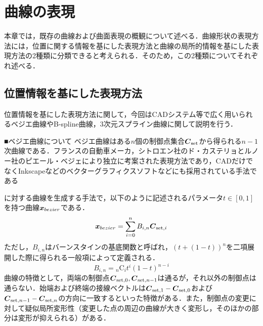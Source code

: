

\section{曲線の表現}
	本章では，既存の曲線および曲面表現の概観について述べる．曲線形状の表現方法には，位置に関する情報を基にした表現方法と曲線の局所的情報を基にした表現方法の2種類に分類できると考えられる．そのため，この2種類についてそれぞれ述べる．
	\subsection{位置情報を基にした表現方法}
		位置情報を基にした表現方法に関して，今回はCADシステム等で広く用いられるベジエ曲線やB-spline曲線，3次元スプライン曲線に関して説明を行う．
		
		■ベジエ曲線について
		ベジエ曲線はある$ n $個の制御点集合$ \boldsymbol{C}_{\mathrm{set}} $から得られる$ n-1 $次曲線である．フランスの自動車メーカ，シトロエン社のド・カステリョとルノー社のピエール・ベジェにより独立に考案された表現方法であり，CADだけでなくInkscapeなどのベクターグラフィクスソフトなどにも採用されている手法である
		
		に対する曲線を生成する手法で，以下のように記述されるパラメータ$ t \in [0,1]$を持つ曲線$ \boldsymbol{x}_{bezier} $である．
		\begin{equation}\label{eq:bezier line}
			\boldsymbol{x}_{bezier} = \sum_{i=0}^{n} B_{i,n}\boldsymbol{C}_{\mathrm{set},i}
		\end{equation}
		ただし，$ B_{i,n} $はバーンスタインの基底関数と呼ばれ，$ (t+(1-t))^n $を二項展開した際に得られる一般項によって定義される．
		\begin{equation}\label{eq:bezier algorithm}
			B_{i,n} = {}_n \mathrm{C}_i t^i (1-t)^{n-i}
		\end{equation}
		曲線の特徴として，両端の制御点$ \boldsymbol{C}_{\mathrm{set},0},\boldsymbol{C}_{\mathrm{set},n-1} $は通るが，それ以外の制御点は通らない．始端および終端の接線ベクトルは$ \boldsymbol{C}_{\mathrm{set},1}-\boldsymbol{C}_{\mathrm{set},0} $および$ \boldsymbol{C}_{\mathrm{set},n-1}-\boldsymbol{C}_{\mathrm{set},n} $の方向に一致するといった特徴がある．また，制御点の変更に対して疑似局所変形性（変更した点の周辺の曲線が大きく変形し，そのほかの部分は変形が抑えられる）がある．
		
